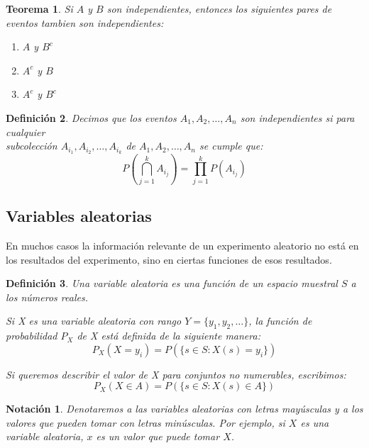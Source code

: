 \documentclass[14pt]{extarticle}
\newtheorem{theorem}{Teorema}[section]
\newtheorem{definition}[theorem]{Definición}
\newtheorem{note}{Notación}[section]
\begin{document}
\begin{theorem}
    Si $A$ y $B$ son independientes, entonces los siguientes pares de eventos tambien son independientes:
    \begin{enumerate}
        \item $A$ y $B^c$
        \item $A^c$ y $B$
        \item $A^c$ y $B^c$
    \end{enumerate}
\end{theorem}

\begin{definition}
    Decimos que los eventos $A_1, A_2, \ldots, A_n$ son independientes si para cualquier \\ 
    subcolección $A_{i_1}, A_{i_2}, \ldots, A_{i_k}$ de $A_1, A_2, \ldots, A_n$ se cumple que:
    \[
        P(\bigcap_{j=1}^k A_{i_j}) = \prod_{j=1}^k P(A_{i_j})
    \]
\end{definition}



\subsection{Variables aleatorias}



En muchos casos la información relevante de un experimento aleatorio no está en los resultados del experimento, sino en ciertas funciones de esos resultados.

\begin{definition}
    Una variable aleatoria es una función de un espacio muestral $S$ a los números reales.

    Si X es una variable aleatoria con rango $Y = \{y_1, y_2, \ldots\}$, la función de probabilidad $P_{X}$ de X está definida de la
    siguiente manera: 
    \[ P_X(X=y_i) = P(\{s \in S : X(s) = y_i\}) \]

    Si queremos describir el valor de X para conjuntos no numerables, escribimos:
    \[ P_X(X \in A) = P(\{s \in S : X(s) \in A\}) \]
\end{definition}

\begin{note}
    Denotaremos a las variables aleatorias con letras mayúsculas y a los valores que pueden tomar con letras minúsculas.
    Por ejemplo, si $X$ es una variable aleatoria, $x$ es un valor que puede tomar $X$.
\end{note}
\end{document}

